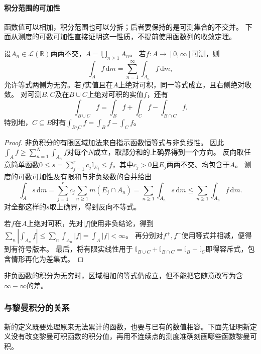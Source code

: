 \paragraph{积分范围的可加性}
函数值可以相加，积分范围也可以分拆；后者要保持的是可测集合的不交并。
下面从测度的可数可加性直接证明这一性质，不提前使用函数列的收敛定理。
\begin{theorem}[勒贝格积分的区域可加性]
\label{thm:analysis-integral-set-additivity}
设$A_n\in\mathcal L(\mathbb R)$两两不交，$A=\bigcup_{n\geq1}A_n$。
若$f:A\to[0,\infty]$可测，则
\[
 \int_Af\,\mathrm dm=\sum_{n=1}^{\infty}\int_{A_n}f\,\mathrm dm,
\]
允许等式两侧为无穷。若$f$实值且在$A$上绝对可积，同一等式成立，且右侧绝对收敛。
对可测$B,C$及在$B\cup C$上绝对可积的实值$f$，还有
\[
 \int_{B\cup C}f=\int_Bf+\int_Cf-\int_{B\cap C}f.
\]
特别地，$C\subseteq B$时有$\int_{B\setminus C}f=\int_Bf-\int_Cf$。
\end{theorem}
\begin{proof}
非负积分的有限区域加法来自指示函数恒等式与非负线性。
因此$\int_A f\geq\sum_{n=1}^N\int_{A_n}f$对每个$N$成立，取部分和的上确界得到一个方向。
反向取任意简单函数$0\leq s=\sum_{j=1}^r c_j\mathbb I_{E_j}\leq f$，其中$c_j>0$且$E_j$两两不交、均包含于$A$。
测度的可数可加性及有限和与非负级数的合并给出
\[
 \int_As\,\mathrm dm
 =\sum_{j=1}^r c_j\sum_{n\geq1}m(E_j\cap A_n)
 =\sum_{n\geq1}\int_{A_n}s\,\mathrm dm
 \leq\sum_{n\geq1}\int_{A_n}f\,\mathrm dm.
\]
对全部这样的$s$取上确界，得到反向不等式。

若$f$在$A$上绝对可积，先对$|f|$使用非负结论，得到
$\sum_n|\int_{A_n}f|\leq\sum_n\int_{A_n}|f|=\int_A|f|<\infty$。
再分别对$f^+,f^-$使用等式并相减，便得到有符号版本。
最后，将有限实线性用于
$\mathbb I_{B\cup C}+\mathbb I_{B\cap C}=\mathbb I_B+\mathbb I_C$即得容斥式，包含情形再化为差集式。
\end{proof}
非负函数的积分为无穷时，区域相加的等式仍成立，但不能把它随意改写为含$\infty-\infty$的差。

\subsubsection{与黎曼积分的关系}

新的定义既要处理原来无法累计的函数，也要与已有的数值相容。下面先证明新定义没有改变黎曼可积函数的积分值，再用不连续点的测度准确刻画哪些函数黎曼可积。


